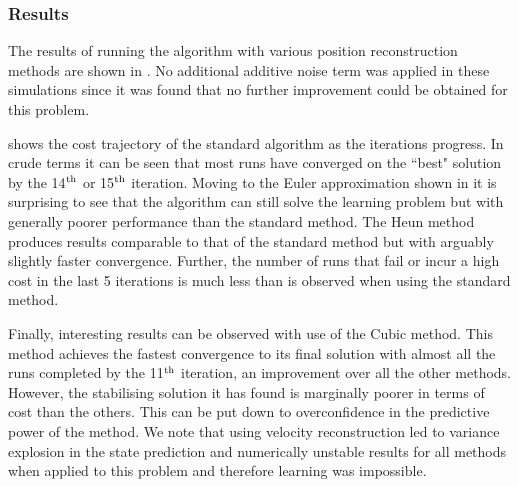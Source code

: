 \subsubsection{Results}

The results of running the algorithm with various position reconstruction methods are shown in . No additional additive noise term was applied in these simulations since it was found that no further improvement could be obtained for this problem.

 shows the cost trajectory of the standard algorithm as the iterations progress. In crude terms it can be seen that most runs have converged on the ``best" solution by the 14$^{\text{th}}$ or 15$^{\text{th}}$ iteration. Moving to the Euler approximation shown in  it is surprising to see that the algorithm can still solve the learning problem but with generally poorer performance than the standard method. The Heun method produces results comparable to that of the standard method but with arguably slightly faster convergence. Further, the number of runs that fail or incur a high cost in the last 5 iterations is much less than is observed when using the standard method.

Finally, interesting results can be observed with use of the Cubic method. This method achieves the fastest convergence to its final solution with almost all the runs completed by the 11$^{\text{th}}$ iteration, an improvement over all the other methods. However, the stabilising solution it has found is marginally poorer in terms of cost than the others. This can be put down to overconfidence in the predictive power of the method. 
%
We note that using velocity reconstruction led to variance explosion in the state prediction and numerically unstable results for all methods when applied to this problem and therefore learning was impossible.






